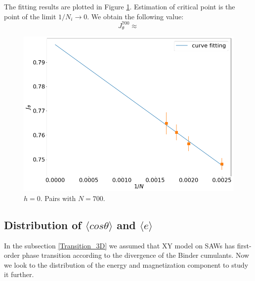 The fitting results are plotted in Figure \ref{fig:JthetaLinear_3D}. Estimation of critical point is the point of the limit $1/N_i \rightarrow 0$. We obtain the following value: 
\begin{equation}
\label{eq:critical_J_theta_3D}
J_{\theta}^{700} \approx    %
\end{equation}

 \begin{figure}
	\centering 
	\includegraphics[scale=0.2]{Images/criticalr2_3D.png}
	\caption{$h=0$. Pairs with $N=700$.  }
	\label{fig:JthetaLinear_3D}
\end{figure}


\subsection{Distribution of $\langle cos \theta \rangle$ and $\langle e \rangle$ } \label{sec:distributions_3D}

In the subsection \ref{Transition_3D} we assumed that XY model on SAWs has first-order phase transition according to the divergence of the Binder cumulants. Now we look to the distribution of the energy and magnetization component to study it further. 

